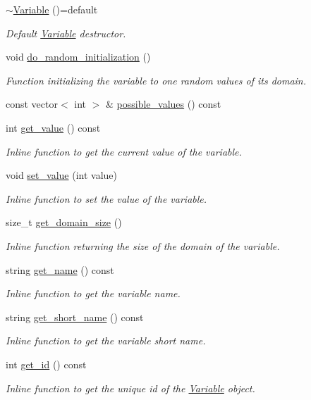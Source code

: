 \begin{DoxyCompactItemize}
\hyperlink{classghost_1_1Variable_a06aa85e69ddf9a887dcc31c61dca70ab}{$\sim$\+Variable} ()=default
\begin{DoxyCompactList}\small\item\em Default \hyperlink{classghost_1_1Variable}{Variable} destructor. \end{DoxyCompactList}\item 
void \hyperlink{classghost_1_1Variable_a37018e24ee21e12649599409d7ac3640}{do\+\_\+random\+\_\+initialization} ()
\begin{DoxyCompactList}\small\item\em Function initializing the variable to one random values of its domain. \end{DoxyCompactList}\item 
const vector$<$ int $>$ \& \hyperlink{classghost_1_1Variable_a82380b5d0d4f679401c0139d5d30ad60}{possible\+\_\+values} () const 
\item 
int \hyperlink{classghost_1_1Variable_a7bdebf8b2a369f337690ac38ece31793}{get\+\_\+value} () const 
\begin{DoxyCompactList}\small\item\em Inline function to get the current value of the variable. \end{DoxyCompactList}\item 
void \hyperlink{classghost_1_1Variable_a06f6c296986a017e1713961b4d763b0c}{set\+\_\+value} (int value)
\begin{DoxyCompactList}\small\item\em Inline function to set the value of the variable. \end{DoxyCompactList}\item 
size\+\_\+t \hyperlink{classghost_1_1Variable_afd4a3fe7e7a6d1438c4e90c72b77eee7}{get\+\_\+domain\+\_\+size} ()
\begin{DoxyCompactList}\small\item\em Inline function returning the size of the domain of the variable. \end{DoxyCompactList}\item 
string \hyperlink{classghost_1_1Variable_a70c22841aa8d0ebe75eea92f1831c126}{get\+\_\+name} () const 
\begin{DoxyCompactList}\small\item\em Inline function to get the variable name. \end{DoxyCompactList}\item 
string \hyperlink{classghost_1_1Variable_a993e65196f2bcd0e5e5f4453736e36c5}{get\+\_\+short\+\_\+name} () const 
\begin{DoxyCompactList}\small\item\em Inline function to get the variable short name. \end{DoxyCompactList}\item 
int \hyperlink{classghost_1_1Variable_adc5da5dedaa3d47a5eb4092b08c3f77c}{get\+\_\+id} () const 
\begin{DoxyCompactList}\small\item\em Inline function to get the unique id of the \hyperlink{classghost_1_1Variable}{Variable} object. \end{DoxyCompactList}\end{DoxyCompactItemize}
